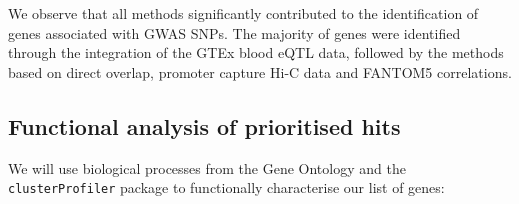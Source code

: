 \documentclass[9pt,a4paper,]{extarticle}
\newenvironment{Shaded}{\begin{snugshade}}{\end{snugshade}}
\newcommand{\KeywordTok}[1]{\textcolor[rgb]{0.13,0.29,0.53}{\textbf{#1}}}
\newcommand{\DataTypeTok}[1]{\textcolor[rgb]{0.13,0.29,0.53}{#1}}
\newcommand{\FloatTok}[1]{\textcolor[rgb]{0.00,0.00,0.81}{#1}}
\newcommand{\CharTok}[1]{\textcolor[rgb]{0.31,0.60,0.02}{#1}}
\newcommand{\StringTok}[1]{\textcolor[rgb]{0.31,0.60,0.02}{#1}}
\newcommand{\OtherTok}[1]{\textcolor[rgb]{0.56,0.35,0.01}{#1}}
\newcommand{\OperatorTok}[1]{\textcolor[rgb]{0.81,0.36,0.00}{\textbf{#1}}}
\newcommand{\NormalTok}[1]{#1}
\theoremstyle{definition}
\theoremstyle{definition}
\theoremstyle{definition}
\theoremstyle{remark}
\begin{document}
We observe that all methods significantly contributed to the identification of genes associated with GWAS SNPs.
The majority of genes were identified through the integration of the GTEx blood eQTL data, followed by the methods based on direct overlap, promoter capture Hi-C data and FANTOM5 correlations.

\subsection{Functional analysis of prioritised hits}\label{functional-analysis-of-prioritised-hits}

We will use biological processes from the Gene Ontology \citep{Ashburner2000} and the \texttt{clusterProfiler} package \citep{Yu2012} to functionally characterise our list of genes:

\begin{Shaded}
\end{Shaded}
\end{document}
